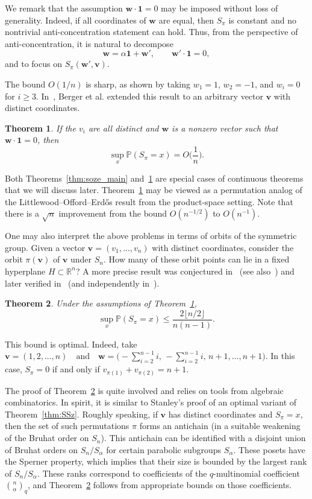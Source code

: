 \documentclass[reqno]{amsart}
\newcommand\R{{\mathbb{R}}}
\renewcommand\P{{\mathbb{P}}}
\newcommand\BMv{{\bm v}}
\newcommand\BMw{{\bm w}}
\theoremstyle{plain}
\newtheorem{theorem}{Theorem}[section]
\theoremstyle{definition}
\begin{document}
We remark that the assumption $\BMw\cdot\mathbf{1}=0$ may be imposed without
loss of generality. Indeed, if all coordinates of $\BMw$ are equal, then
$S_{\pi}$ is constant and no nontrivial anti-concentration statement can hold.
Thus, from the perspective of anti-concentration, it is natural to decompose
\[
\BMw=\alpha\mathbf{1}+\BMw',
\qquad \BMw'\cdot\mathbf{1}=0,
\]
and to focus on $S_{\pi}(\BMw',\BMv)$.

The bound $O(1/n)$ is sharp, as shown by taking $w_1=1$, $w_2=-1$, and
$w_i=0$ for $i\ge3$. In~\cite{Vuetal}, Berger et al. extended this
result to an arbitrary vector $\BMv$ with distinct coordinates.

\begin{theorem}\label{thm:Ber}
If the $v_i$ are all distinct and $\BMw$ is a nonzero vector such that
$\BMw\cdot\mathbf{1}=0$, then
\[
\sup_x \P(S_{\pi}=x)=O\Big(\frac{1}{n}\Big).
\]
\end{theorem}
Both Theorems~\ref{thm:soze_main} and~\ref{thm:Ber} are special cases of
continuous theorems that we will discuss later. Theorem~\ref{thm:Ber} may be
viewed as a permutation analog of the Littlewood--Offord--Erd\H{o}s result
from the product-space setting. Note that there is a $\sqrt{n}$ improvement
from the bound $O(n^{-1/2})$ to $O(n^{-1})$.

One may also interpret the above problems in terms of orbits of the symmetric
group. Given a vector $\BMv=(v_1,\dots,v_n)$ with distinct coordinates,
consider the orbit $\pi(\BMv)$ of $\BMv$ under $S_n$. How many of these orbit
points can lie in a fixed hyperplane $H\subset\R^n$? A more precise result was conjectured in~\cite{HMS} (see also~\cite{HGy}) and
later verified in~\cite{Paw} (and independently in~\cite{APZ}).

\begin{theorem}\label{thm:discrete:1}
Under the assumptions of Theorem~\ref{thm:Ber},
\begin{equation}\label{eqn:1}
\sup_x \P(S_{\pi}=x)
\le \frac{2\lfloor n/2\rfloor}{n(n-1)}.
\end{equation}
\end{theorem}
This bound is optimal. Indeed, take
\(
\BMv=(1,2,\dots,n)
\quad\text{and}\quad
\BMw=\bigl(-\!\sum_{i=2}^{n-1} i,\,
-\!\sum_{i=2}^{n-1} i,\,
n+1,\dots,n+1\bigr).
\)
In this case, $S_{\pi}=0$ if and only if
$v_{\pi(1)}+v_{\pi(2)}=n+1$.

The proof of Theorem~\ref{thm:discrete:1} is quite involved and relies on tools from algebraic combinatorics. In spirit, it is similar to Stanley’s proof \cite{Stan} of an optimal variant of Theorem~\ref{thm:SSz}. Roughly speaking, if $\BMv$ has distinct
coordinates and $S_{\pi}=x$, then the set of such permutations $\pi$ forms an
antichain (in a suitable weakening of the Bruhat order on $S_n$). This
antichain can be identified with a disjoint union of Bruhat orders on
$S_n/S_{\alpha}$ for certain parabolic subgroups $S_{\alpha}$. These posets
have the Sperner property, which implies that their size is bounded by the
largest rank of $S_n/S_{\alpha}$. These ranks correspond to coefficients of the
$q$-multinomial coefficient $\binom{n}{\alpha}_q$, and
Theorem~\ref{thm:discrete:1} follows from appropriate bounds on those
coefficients.
\end{document}
